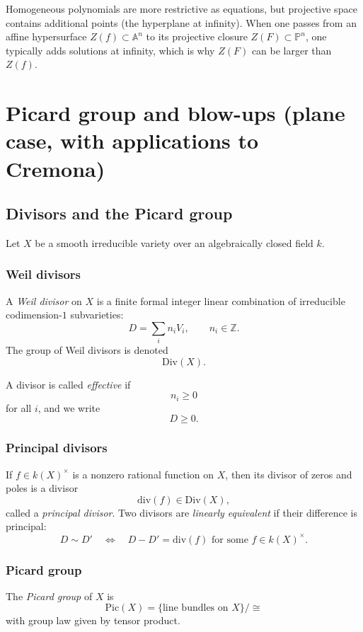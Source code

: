 \documentclass[12pt,a4paper]{article}
\theoremstyle{plain}
\theoremstyle{definition}      %
\begin{document}
Homogeneous polynomials are more restrictive as equations, but projective space contains additional points (the hyperplane at infinity).
When one passes from an affine hypersurface $Z(f)\subset \mathbb A^n$ to its projective closure $Z(F)\subset \mathbb P^n$, one typically adds solutions at infinity, which is why $Z(F)$ can be larger than $Z(f)$.


\section*{Picard group and blow-ups (plane case, with applications to Cremona)}

\subsection*{Divisors and the Picard group}

Let $X$ be a smooth irreducible variety over an algebraically closed field $k$.

\subsubsection*{Weil divisors}

A \emph{Weil divisor} on $X$ is a finite formal integer linear combination of irreducible codimension-$1$ subvarieties:
\[
D=\sum_i n_i V_i,
\qquad
n_i\in \mathbb Z.
\]
The group of Weil divisors is denoted
\[
\mathrm{Div}(X).
\]

A divisor is called \emph{effective} if
\[
n_i\ge 0
\]
for all $i$, and we write
\[
D\ge 0.
\]

\subsubsection*{Principal divisors}

If $f\in k(X)^\times$ is a nonzero rational function on $X$, then its divisor of zeros and poles is a divisor
\[
\mathrm{div}(f)\in \mathrm{Div}(X),
\]
called a \emph{principal divisor}.
Two divisors are \emph{linearly equivalent} if their difference is principal:
\[
D\sim D'
\quad\Longleftrightarrow\quad
D-D'=\mathrm{div}(f)
\text{ for some } f\in k(X)^\times.
\]

\subsubsection*{Picard group}

The \emph{Picard group} of $X$ is
\[
\mathrm{Pic}(X)
=
\{\text{line bundles on }X\}/\cong
\]
with group law given by tensor product.
\end{document}

